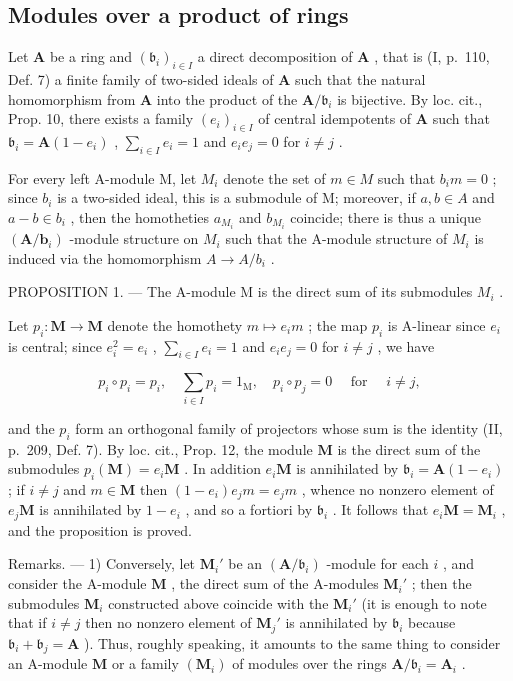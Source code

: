 \subsection{Modules over a product of rings}

Let \(\mathbf{A}\) be a ring and \((\mathfrak{b}_i)_{i\in I}\) a direct decomposition of \(\mathbf{A}\) , that is (I, p.~110, Def. 7) a finite family of two-sided ideals of \(\mathbf{A}\) such that the natural homomorphism from \(\mathbf{A}\) into the product of the \(\mathbf{A} / \mathfrak{b}_i\) is bijective. By loc. cit., Prop. 10, there exists a family \((e_i)_{i\in I}\) of central idempotents of \(\mathbf{A}\) such that \(\mathfrak{b}_i = \mathbf{A}(1 - e_i)\) , \(\sum_{i\in I}e_i = 1\) and \(e_i e_j = 0\) for \(i\neq j\) .

For every left A-module M, let \(M_{i}\) denote the set of \(m \in M\) such that \(b_{i}m = 0\) ; since \(b_{i}\) is a two-sided ideal, this is a submodule of M; moreover, if \(a, b \in A\) and \(a - b \in b_{i}\) , then the homotheties \(a_{M_{i}}\) and \(b_{M_{i}}\) coincide; there is thus a unique \((\mathbf{A}/\mathbf{b}_{i})\) -module structure on \(M_{i}\) such that the A-module structure of \(M_{i}\) is induced via the homomorphism \(A \to A/b_{i}\) .

PROPOSITION 1. --- The A-module M is the direct sum of its submodules \(M_{i}\) .

Let \(p_i: \mathbf{M} \to \mathbf{M}\) denote the homothety \(m \mapsto e_i m\) ; the map \(p_i\) is A-linear since \(e_i\) is central; since \(e_i^2 = e_i\) , \(\sum_{i \in I} e_i = 1\) and \(e_i e_j = 0\) for \(i \neq j\) , we have

\[
p _ {i} \circ p _ {i} = p _ {i}, \quad \sum_ {i \in I} p _ {i} = 1 _ {\mathrm{M}}, \quad p _ {i} \circ p _ {j} = 0 \quad \text { for } \quad i \neq j,
\]

and the \(p_i\) form an orthogonal family of projectors whose sum is the identity (II, p.~209, Def. 7). By loc. cit., Prop. 12, the module \(\mathbf{M}\) is the direct sum of the submodules \(p_i(\mathbf{M}) = e_i\mathbf{M}\) . In addition \(e_i\mathbf{M}\) is annihilated by \(\mathfrak{b}_i = \mathbf{A}(1 - e_i)\) ; if \(i \neq j\) and \(m \in \mathbf{M}\) then \((1 - e_i)e_jm = e_jm\) , whence no nonzero element of \(e_j\mathbf{M}\) is annihilated by \(1 - e_i\) , and so a fortiori by \(\mathfrak{b}_i\) . It follows that \(e_i\mathbf{M} = \mathbf{M}_i\) , and the proposition is proved.

Remarks. --- 1) Conversely, let \(\mathbf{M}_i'\) be an \((\mathbf{A} / \mathfrak{b}_i)\) -module for each \(i\) , and consider the A-module \(\mathbf{M}\) , the direct sum of the A-modules \(\mathbf{M}_i'\) ; then the submodules \(\mathbf{M}_i\) constructed above coincide with the \(\mathbf{M}_i'\) (it is enough to note that if \(i \neq j\) then no nonzero element of \(\mathbf{M}_j'\) is annihilated by \(\mathfrak{b}_i\) because \(\mathfrak{b}_i + \mathfrak{b}_j = \mathbf{A}\) ). Thus, roughly speaking, it amounts to the same thing to consider an A-module \(\mathbf{M}\) or a family \((\mathbf{M}_i)\) of modules over the rings \(\mathbf{A} / \mathfrak{b}_i = \mathbf{A}_i\) .

